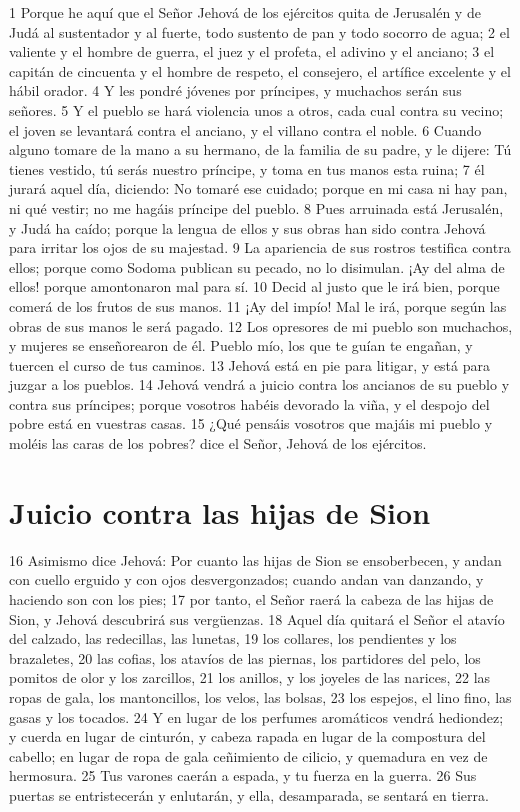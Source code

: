 1 Porque he aquí que el Señor Jehová de los ejércitos quita de Jerusalén y de Judá al sustentador y al fuerte, todo sustento de pan y todo socorro de agua;
2 el valiente y el hombre de guerra, el juez y el profeta, el adivino y el anciano;
3 el capitán de cincuenta y el hombre de respeto, el consejero, el artífice excelente y el hábil orador.
4 Y les pondré jóvenes por príncipes, y muchachos serán sus señores.
5 Y el pueblo se hará violencia unos a otros, cada cual contra su vecino; el joven se levantará contra el anciano, y el villano contra el noble.
6 Cuando alguno tomare de la mano a su hermano, de la familia de su padre, y le dijere: Tú tienes vestido, tú serás nuestro príncipe, y toma en tus manos esta ruina;
7 él jurará aquel día, diciendo: No tomaré ese cuidado; porque en mi casa ni hay pan, ni qué vestir; no me hagáis príncipe del pueblo.
8 Pues arruinada está Jerusalén, y Judá ha caído; porque la lengua de ellos y sus obras han sido contra Jehová para irritar los ojos de su majestad.
9 La apariencia de sus rostros testifica contra ellos; porque como Sodoma publican su pecado, no lo disimulan. ¡Ay del alma de ellos! porque amontonaron mal para sí.
10 Decid al justo que le irá bien, porque comerá de los frutos de sus manos.
11 ¡Ay del impío! Mal le irá, porque según las obras de sus manos le será pagado.
12 Los opresores de mi pueblo son muchachos, y mujeres se enseñorearon de él. Pueblo mío, los que te guían te engañan, y tuercen el curso de tus caminos.
13 Jehová está en pie para litigar, y está para juzgar a los pueblos.
14 Jehová vendrá a juicio contra los ancianos de su pueblo y contra sus príncipes; porque vosotros habéis devorado la viña, y el despojo del pobre está en vuestras casas.
15 ¿Qué pensáis vosotros que majáis mi pueblo y moléis las caras de los pobres? dice el Señor, Jehová de los ejércitos.

\section*{Juicio contra las hijas de Sion}

16 Asimismo dice Jehová: Por cuanto las hijas de Sion se ensoberbecen, y andan con cuello erguido y con ojos desvergonzados; cuando andan van danzando, y haciendo son con los pies;
17 por tanto, el Señor raerá la cabeza de las hijas de Sion, y Jehová descubrirá sus vergüenzas.
18 Aquel día quitará el Señor el atavío del calzado, las redecillas, las lunetas,
19 los collares, los pendientes y los brazaletes,
20 las cofias, los atavíos de las piernas, los partidores del pelo, los pomitos de olor y los zarcillos,
21 los anillos, y los joyeles de las narices,
22 las ropas de gala, los mantoncillos, los velos, las bolsas,
23 los espejos, el lino fino, las gasas y los tocados.
24 Y en lugar de los perfumes aromáticos vendrá hediondez; y cuerda en lugar de cinturón, y cabeza rapada en lugar de la compostura del cabello; en lugar de ropa de gala ceñimiento de cilicio, y quemadura en vez de hermosura.
25 Tus varones caerán a espada, y tu fuerza en la guerra.
26 Sus puertas se entristecerán y enlutarán, y ella, desamparada, se sentará en tierra.

